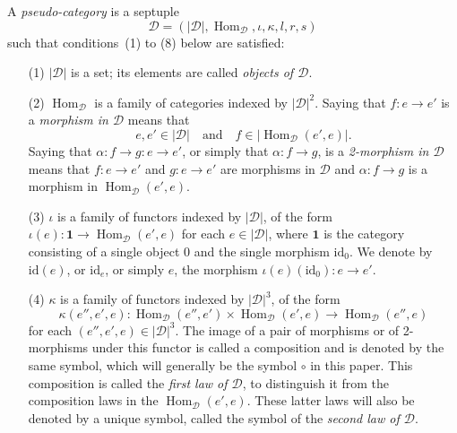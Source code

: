 \documentclass{article}
\newcommand{\id}{\mathrm{id}}
\newcommand{\textand}{\quad\text{and}\quad}
\newcommand{\cat}[1]{\mathcal{#1}}
\newcommand{\set}[1]{|#1|}
\DeclareMathOperator{\Hom}{Hom}
\begin{document}
A \emph{pseudo-category} is a septuple
\[
  \cat{D}
  = (\set{\cat{D}},\Hom_\cat{D},\iota,\kappa,l,r,s)
\]
such that conditions~(1) to (8) below are satisfied:
\begin{enumerate}
  \item[(1)]
    $\set{\cat{D}}$ is a set; its elements are called \emph{objects of $\cat{D}$}.

  \item[(2)]
    $\Hom_\cat{D}$ is a family of categories indexed by $\set{\cat{D}}^2$.
    Saying that $f\colon e\to e'$ is a \emph{morphism in $\cat{D}$} means that
    \[
      e,e'\in\set{\cat{D}}
      \textand
      f\in\set{\Hom_\cat{D}(e',e)}.
    \]
    Saying that $\alpha\colon f\to g\colon e\to e'$, or simply that $\alpha\colon f\to g$, is a \emph{2-morphism in $\cat{D}$} means that $f\colon e\to e'$ and $g\colon e\to e'$ are morphisms in $\cat{D}$ and $\alpha\colon f\to g$ is a morphism in $\Hom_\cat{D}(e',e)$.

  \item[(3)]
    $\iota$ is a family of functors indexed by $\set{\cat{D}}$, of the form $\iota(e)\colon\mathbf{1}\to\Hom_\cat{D}(e',e)$ for each $e\in\set{\cat{D}}$, where $\mathbf{1}$ is the category consisting of a single object $0$ and the single morphism $\id_0$.
    We denote by $\id(e)$, or $\id_e$, or simply $e$, the morphism $\iota(e)(\id_0)\colon e\to e'$.

  \item[(4)]
    $\kappa$ is a family of functors indexed by $\set{\cat{D}}^3$, of the form
    \[
      \kappa(e'',e',e)\colon
      \Hom_\cat{D}(e'',e')\times\Hom_\cat{D}(e',e)
      \to \Hom_\cat{D}(e'',e)
    \]
    for each $(e'',e',e)\in\set{\cat{D}}^3$.
    The image of a pair of morphisms or of 2-morphisms under this functor is called a composition and is denoted by the same symbol, which will generally be the symbol $\circ$ in this paper.
    This composition is called the \emph{first law of $\cat{D}$}, to distinguish it from the composition laws in the $\Hom_\cat{D}(e',e)$.
    These latter laws will also be denoted by a unique symbol, called the symbol of the \emph{second law of $\cat{D}$}.


\end{enumerate}
\end{document}
